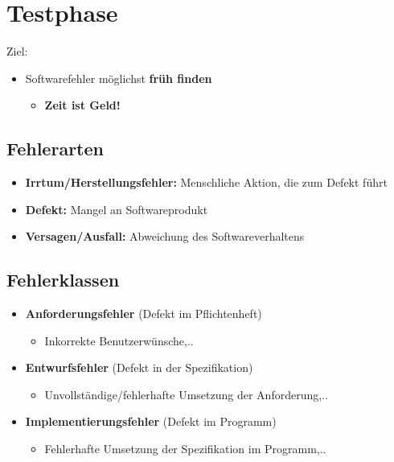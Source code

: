 \section{Testphase}
	
Ziel:
		
\begin{itemize}
\item Softwarefehler möglichst \textbf{früh finden}
\begin{itemize}
\item \textbf{Zeit ist Geld!}
\end{itemize}
\end{itemize}
	
\subsection{Fehlerarten}
	
\begin{itemize}
\item \textbf{Irrtum/Herstellungsfehler:} Menschliche Aktion, die zum Defekt führt
\item \textbf{Defekt:} Mangel an Softwareprodukt
\item \textbf{Versagen/Ausfall:} Abweichung des Softwareverhaltens
\end{itemize}
		
\subsection{Fehlerklassen}

\begin{itemize}
\item \textbf{Anforderungsfehler} (Defekt im Pflichtenheft)
\begin{itemize}
\item Inkorrekte Benutzerwünsche,..
\end{itemize}
\item \textbf{Entwurfsfehler} (Defekt in der Spezifikation)
\begin{itemize}
\item Unvollständige/fehlerhafte Umsetzung der Anforderung,..
\end{itemize}
\item \textbf{Implementierungsfehler} (Defekt im Programm)
\begin{itemize}
\item Fehlerhafte Umsetzung der Spezifikation im Programm,..
\end{itemize}
\end{itemize}
	
